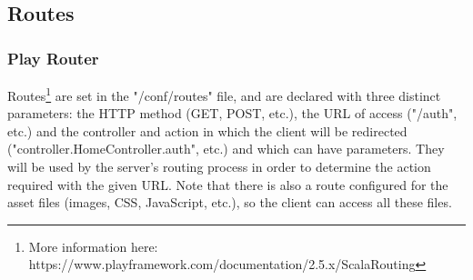 \documentclass[a4paper,11pt]{report}
\begin{document}
\subsection{Routes}
\subsubsection{Play Router}
Routes\footnote{More information here: https://www.playframework.com/documentation/2.5.x/ScalaRouting} are set in the "/conf/routes" file, and are declared with three distinct parameters: the HTTP method (GET, POST, etc.), the URL of access ("/auth", etc.) and the controller and action in which the client will be redirected ("controller.HomeController.auth", etc.) and which can have parameters. They will be used by the server's routing process in order to determine the action required with the given URL. Note that there is also a route configured for the asset files (images, CSS, JavaScript, etc.), so the client can access all these files.
\bigskip
\end{document}
